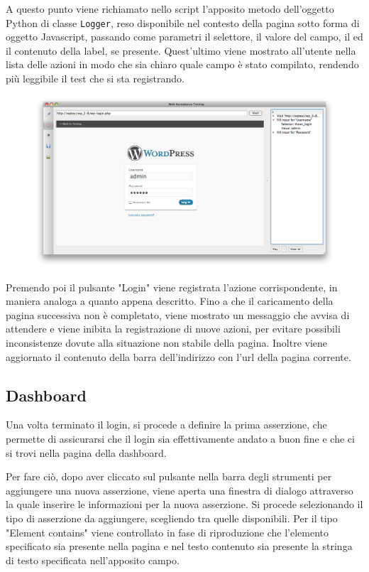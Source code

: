 \documentclass[12pt]{toptesi}
\begin{document}
A questo punto viene richiamato nello script l'apposito metodo dell'oggetto Python di classe \verb|Logger|, reso disponibile nel contesto della pagina sotto forma di oggetto Javascript, passando come parametri il selettore, il valore del campo, il ed il contenuto della label, se presente. Quest'ultimo viene mostrato all'utente nella lista delle azioni in modo che sia chiaro quale campo è stato compilato, rendendo più leggibile il test che si sta registrando.

\begin{figure}[htbp]
\begin{center}
\includegraphics[width=\textwidth]{images/wp_tour/2_fill_login.png}
\end{center}
\end{figure}

Premendo poi il pulsante "Login" viene registrata l'azione corrispondente, in maniera analoga a quanto appena descritto. Fino a che il caricamento della pagina successiva non è completato, viene mostrato un messaggio che avvisa di attendere e viene inibita la registrazione di nuove azioni, per evitare possibili inconsistenze dovute alla situazione non stabile della pagina. Inoltre viene aggiornato il contenuto della barra dell'indirizzo con l'url della pagina corrente.

\subsection{Dashboard}

Una volta terminato il login, si procede a definire la prima asserzione, che permette di assicurarsi che il login sia effettivamente andato a buon fine e che ci si trovi nella pagina della dashboard. 

Per fare ciò, dopo aver cliccato sul pulsante nella barra degli strumenti per aggiungere una nuova asserzione, viene aperta una finestra di dialogo attraverso la quale inserire le informazioni per la nuova asserzione. Si procede selezionando il tipo di asserzione da aggiungere, scegliendo tra quelle disponibili. Per il tipo "Element contains" viene controllato in fase di riproduzione che l'elemento specificato sia presente nella pagina e nel testo contenuto sia presente la stringa di testo specificata nell'apposito campo.
\end{document}
